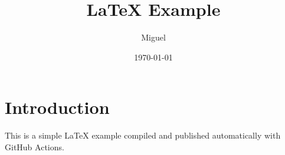 \documentclass{article}
\title{LaTeX Example}
\author{Miguel}
\date{\today}
\begin{document}
\maketitle

\section{Introduction}

This is a simple \LaTeX{} example compiled and published automatically with GitHub Actions.
\end{document}
